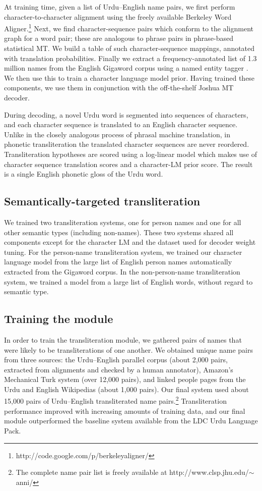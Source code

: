 \documentclass[logo]{pbml}
\begin{document}
At training time, given a list of Urdu--English name pairs, we first perform character-to-character alignment using the freely available Berkeley Word Aligner.\footnote{http://code.google.com/p/berkeleyaligner/} Next, we find character-sequence pairs which conform to the alignment graph for a word pair; these are analogous to phrase pairs in phrase-based statistical MT. We build a table of such character-sequence mappings, annotated with translation probabilities. Finally we extract a frequency-annotated list of 1.3 million names from the English Gigaword corpus using a named entity tagger \cite{Finkel2009}. We then use this to train a character language model prior. Having trained these components, we use them in conjunction with the off-the-shelf Joshua MT decoder.

During decoding, a novel Urdu word is segmented into sequences of characters, and each character sequence is translated to an English character sequence. Unlike in the closely analogous process of phrasal machine translation, in phonetic transliteration the translated character sequences are never reordered. Transliteration hypotheses are scored using a log-linear model which makes use of character sequence translation scores and a character-LM prior score. The result is a single English phonetic gloss of the Urdu word.

\subsection{Semantically-targeted transliteration} \label{semantically-targeted-transliteration}
We trained two transliteration systems, one for person names and one for all other semantic types (including non-names). These two systems shared all components except for the character LM and the dataset used for decoder weight tuning. For the person-name transliteration system, we trained our character language model from the large list of English person names automatically extracted from the Gigaword corpus. In the non-person-name transliteration system, we trained a model from a large list of English words, without regard to semantic type.
	
\subsection{Training the module}
In order to train the transliteration module, we gathered pairs of names that were likely to be transliterations of one another. We obtained unique name pairs from three sources: the Urdu--English parallel corpus (about 2,000 pairs, extracted from alignments and checked by a human annotator), Amazon's Mechanical Turk system (over 12,000 pairs), and linked people pages from the Urdu and English Wikipedias (about 1,000 pairs). Our final system used about 15,000 pairs of Urdu--English transliterated name pairs.\footnote{The complete name pair list is freely available at http://www.clsp.jhu.edu/$\sim$anni/} Transliteration performance improved with increasing amounts of training data, and our final module outperformed the baseline system available from the LDC Urdu Language Pack.
\end{document}
